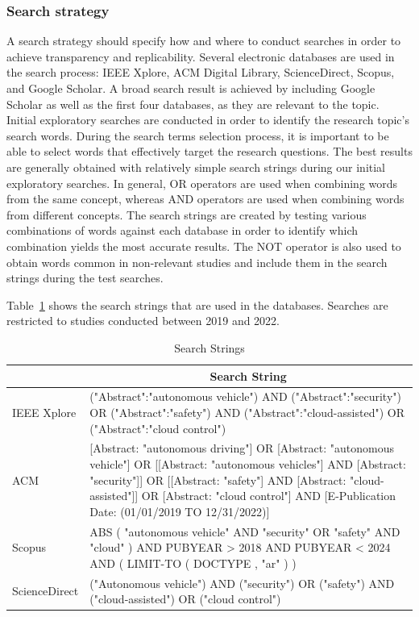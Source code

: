 \documentclass[a4paper,12pt]{article}
\begin{document}
\subsubsection{Search strategy}
\label{sec:search_strategy}
\hspace{5mm} A search strategy should specify how and where to conduct searches in order to achieve transparency and replicability. Several electronic databases are used in the search process: IEEE Xplore, ACM Digital Library, ScienceDirect, Scopus, and Google Scholar. A broad search result is achieved by including Google Scholar as well as the first four databases, as they are relevant to the topic. Initial exploratory searches are conducted in order to identify the research topic's search words. During the search terms selection process, it is important to be able to select words that effectively target the research questions. The best results are generally obtained with relatively simple search strings during our initial exploratory searches. In general, OR operators are used when combining words from the same concept, whereas AND operators are used when combining words from different concepts. The search strings are created by testing various combinations of words against each database in order to identify which combination yields the most accurate results. The NOT operator is also used to obtain words common in non-relevant studies and include them in the search strings during the test searches.

Table~\ref{tab:search_string} shows the search strings that are used in the databases. Searches are restricted to studies conducted between 2019 and 2022.

\begin{table}[h]
\centering
\small
\setlength{\tabcolsep}{4pt}
\caption{Search Strings}
\label{tab:search_string}
\begin{tabularx}{\linewidth}{|>{\centering\arraybackslash}p{2cm}|X|}
\rowcolor[HTML]{00D2CB} 
\hline
\multicolumn{1}{|c|}{\textbf{Database}} & 
\multicolumn{1}{c|}{\textbf{Search String}} \\
\hline
IEEE Xplore & ("Abstract":"autonomous vehicle") AND ("Abstract":"security") OR ("Abstract":"safety") AND ("Abstract":"cloud-assisted") OR ("Abstract":"cloud control") \\
\hline
ACM & [Abstract: "autonomous driving"] OR [Abstract: "autonomous vehicle"] OR [[Abstract: "autonomous vehicles"] AND [Abstract: "security"]] OR [[Abstract: "safety"] AND [Abstract: "cloud-assisted"]] OR [Abstract: "cloud control"] AND [E-Publication Date: (01/01/2019 TO 12/31/2022)] \\
\hline
Scopus & ABS ( "autonomous vehicle" AND "security" OR "safety" AND "cloud" ) AND PUBYEAR > 2018 AND PUBYEAR < 2024 AND ( LIMIT-TO ( DOCTYPE , "ar" ) ) \\
\hline
ScienceDirect & ("Autonomous vehicle") AND ("security") OR ("safety") AND ("cloud-assisted") OR ("cloud control") \\
\hline
\end{tabularx}
\end{table}
\end{document}
